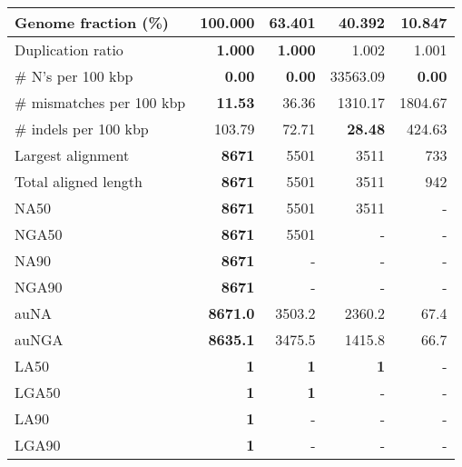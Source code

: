 \documentclass[12pt,a4paper]{article}
\begin{document}
\begin{table}[ht]
\begin{center}
\begin{tabular}{|l*{4}{|r}|}
Genome fraction (\%) & {\bf 100.000} & 63.401 & 40.392 & 10.847 \\ \hline
Duplication ratio & {\bf 1.000} & {\bf 1.000} & 1.002 & 1.001 \\ \hline
\# N's per 100 kbp & {\bf 0.00} & {\bf 0.00} & 33563.09 & {\bf 0.00} \\ \hline
\# mismatches per 100 kbp & {\bf 11.53} & 36.36 & 1310.17 & 1804.67 \\ \hline
\# indels per 100 kbp & 103.79 & 72.71 & {\bf 28.48} & 424.63 \\ \hline
Largest alignment & {\bf 8671} & 5501 & 3511 & 733 \\ \hline
Total aligned length & {\bf 8671} & 5501 & 3511 & 942 \\ \hline
NA50 & {\bf 8671} & 5501 & 3511 & - \\ \hline
NGA50 & {\bf 8671} & 5501 & - & - \\ \hline
NA90 & {\bf 8671} & - & - & - \\ \hline
NGA90 & {\bf 8671} & - & - & - \\ \hline
auNA & {\bf 8671.0} & 3503.2 & 2360.2 & 67.4 \\ \hline
auNGA & {\bf 8635.1} & 3475.5 & 1415.8 & 66.7 \\ \hline
LA50 & {\bf 1} & {\bf 1} & {\bf 1} & - \\ \hline
LGA50 & {\bf 1} & {\bf 1} & - & - \\ \hline
LA90 & {\bf 1} & - & - & - \\ \hline
LGA90 & {\bf 1} & - & - & - \\ \hline
\end{tabular}
\end{center}
\end{table}
\end{document}
